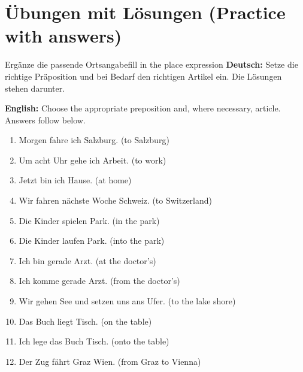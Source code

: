 \documentclass[a4paper,11pt]{article}
\newcommand{\GermanText}[1]{\textbf{Deutsch: }#1\par}
\newcommand{\EnglishText}[1]{{\small\color{SoftGray}\textbf{English: }#1\par}}
\begin{document}
\section{Übungen mit Lösungen (Practice with answers)}
\begin{grammarentry}{Ergänze die passende Ortsangabe}{fill in the place expression}
\GermanText{Setze die richtige Präposition und bei Bedarf den richtigen Artikel ein. Die Lösungen stehen darunter.}
\EnglishText{Choose the appropriate preposition and, where necessary, article. Answers follow below.}
\end{grammarentry}
\begin{exbox}\begin{enumerate}
\item Morgen fahre ich \underline{\hspace{3cm}} Salzburg. (to Salzburg)
\item Um acht Uhr gehe ich \underline{\hspace{3cm}} Arbeit. (to work)
\item Jetzt bin ich \underline{\hspace{3cm}} Hause. (at home)
\item Wir fahren nächste Woche \underline{\hspace{3cm}} Schweiz. (to Switzerland)
\item Die Kinder spielen \underline{\hspace{3cm}} Park. (in the park)
\item Die Kinder laufen \underline{\hspace{3cm}} Park. (into the park)
\item Ich bin gerade \underline{\hspace{3cm}} Arzt. (at the doctor's)
\item Ich komme gerade \underline{\hspace{3cm}} Arzt. (from the doctor's)
\item Wir gehen \underline{\hspace{3cm}} See und setzen uns ans Ufer. (to the lake shore)
\item Das Buch liegt \underline{\hspace{3cm}} Tisch. (on the table)
\item Ich lege das Buch \underline{\hspace{3cm}} Tisch. (onto the table)
\item Der Zug fährt \underline{\hspace{3cm}} Graz \underline{\hspace{3cm}} Wien. (from Graz to Vienna)
\end{enumerate}\end{exbox}
\end{document}
